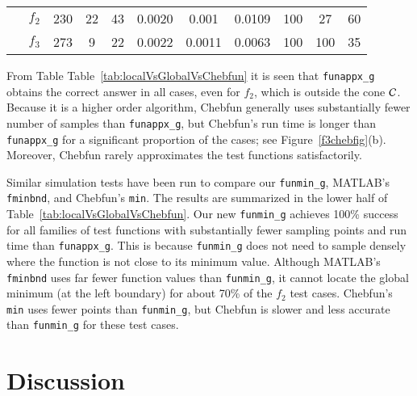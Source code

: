 \documentclass[review]{elsarticle}
\theoremstyle{definition}
\newcommand{\funappxg}{\texttt{funappx\_g}\xspace}
\newcommand{\funming}{\texttt{funmin\_g}\xspace}
\newcommand{\fminbnd}{\texttt{fminbnd}\xspace}
\begin{document}
\begin{table}[bt]
{\begin{tabular}{crrrrrrrrrrrrrrrrrr}
\\ $\phantom{-}f_2$   & \multicolumn{2}{c}{230} &  \multicolumn{2}{c}{22} &  
\multicolumn{2}{c}{43} &  \multicolumn{2}{c}{0.0020} &  \multicolumn{2}{c}{0.001} &  
\multicolumn{2}{c}{0.0109} &  \multicolumn{2}{c}{100} &  \multicolumn{2}{c}{27} &  
\multicolumn{2}{c}{60}
\\ $\phantom{-}f_3$   &  \multicolumn{2}{c}{273} &  \multicolumn{2}{c}{9} &  
\multicolumn{2}{c}{22 } &  \multicolumn{2}{c}{0.0022} &  \multicolumn{2}{c}{0.0011} &  
\multicolumn{2}{c}{0.0063} &  \multicolumn{2}{c}{100} &  \multicolumn{2}{c}{100} &  
\multicolumn{2}{c}{35}
\\ \hline
\end{tabular}
}
\end{table}
%

From Table Table~\ref{tab:localVsGlobalVsChebfun} it is seen that \funappxg{} obtains 
the correct answer in all cases,
even for $f_2$, which is outside the cone $\mathcal{C}$. Because it is a higher order algorithm, 
Chebfun generally uses substantially fewer number of samples than
\funappxg, but Chebfun's run time is longer than \funappxg for a
significant proportion of the cases; see Figure~\ref{f3chebfig}(b). Moreover, Chebfun 
rarely approximates the test functions satisfactorily.


Similar simulation tests have been run to compare our \funming, MATLAB's \fminbnd, and
Chebfun's \texttt{min}. The results are summarized in the lower half of
Table~\ref{tab:localVsGlobalVsChebfun}. Our new \funming{} achieves 100\%
success for all families of test functions with substantially fewer sampling
points and run time than \funappxg. This is because \funming does not need to
sample densely where the function is not close to its minimum value. Although MATLAB's
\fminbnd uses far fewer function values than \funming, it cannot locate the
global minimum (at the left boundary) for about 70\% of the $f_2$ test cases.
Chebfun's {\tt min} uses fewer points than \funming, but Chebfun is slower and
less accurate than \funming for these test cases.






\section{Discussion}
\end{document}
